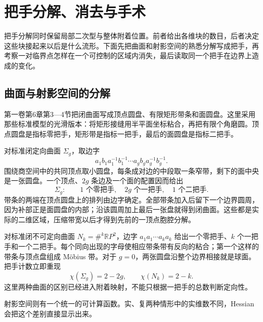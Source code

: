 
% 
% 
% 

\section{把手分解、消去与手术}
\label{g2:sec:1705}

把手分解同时保留局部二次型与整体附着位置。前者给出各维块的数目，后者决定这些块接起来以后是什么流形。下面先把曲面和射影空间的熟悉分解写成把手，再考察一对临界点怎样在一个可控制的区域内消失，最后读取同一个把手在边界上造成的变化。

\subsection{曲面与射影空间的分解}
\label{g2:subsec:1705:01}

第一卷第6章第3—4节把闭曲面写成顶点圆盘、有限矩形带条和面圆盘。这里采用那些标准模型的光滑版本：将矩形接缝用半平面坐标粘合，再把有限个角磨圆。顶点圆盘是指标零把手，矩形带是指标一把手，最后的面圆盘是指标二把手。

\ProseParagraphBreak

对标准闭定向曲面 \(\Sigma_g\)，取边字
\[
	a_1b_1a_1^{-1}b_1^{-1}\cdots a_gb_ga_g^{-1}b_g^{-1}.
\]
围绕商空间中的共同顶点取小圆盘，每条成对边的中段取一条窄带，剩下的面中央是一张圆盘。一个顶点、\(2g\) 条边及一个面的配置因而给出
\[
	\Sigma_g:\qquad 1\text{ 个零把手},\quad 2g\text{ 个一把手},\quad1\text{ 个二把手}.
\]
带条的两端在顶点圆盘上的排列由边字确定。全部带条加入后留下一个边界圆周，因为补部正是面圆盘的内部；沿该圆周加上最后一张盘就得到闭曲面。这些都是实际的二维区域，压缩带宽以后才得到先前的一顶点胞腔分解。

\ProseParagraphBreak

对标准闭不可定向曲面 \(N_k=\#^k\mathbb RP^2\)，边字 \(a_1a_1\cdots a_ka_k\) 给出一个零把手、\(k\) 个一把手和一个二把手。每个同向出现的字母使相应带条带有反向的粘合；第一个这样的带条与顶点盘组成 Möbius 带。对于 \(g=0\)，两张圆盘沿整个边界相接就是球面。把手计数立即重现
\[
	\chi(\Sigma_g)=2-2g,\qquad \chi(N_k)=2-k.
\]
这里两种曲面的区别已经进入附着映射，不能只根据一把手的总数判断定向性。

\ProseParagraphBreak

射影空间则有一个统一的可计算函数。实、复两种情形中的实维数不同，Hessian 会把这个差别直接显示出来。


